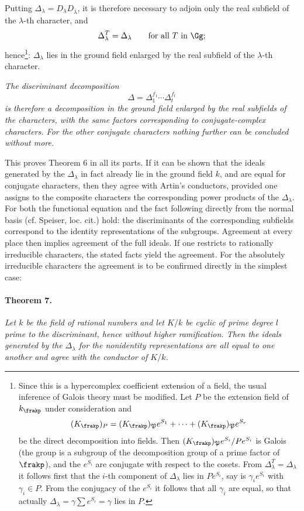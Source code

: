 Putting \(\Delta_\lambda=D_\lambda D_{\bar\lambda}\), it is therefore necessary to adjoin only the real subfield of the \(\lambda\)-th character, and
\[
        \Delta_\lambda^T=\Delta_\lambda
        \qquad\hbox{for all }T\hbox{ in }\Gg;
\]
hence\footnote{Since this is a hypercomplex coefficient extension of a field, the usual inference of Galois theory must be modified. Let \(P\) be the extension field of \(k_\frakp\) under consideration and
\[
        (K_\frakp)_P=(K_\frakp)_\mathfrak P e^{S_1}+\cdots+(K_\frakp)_\mathfrak P e^{S_r}
\]
be the direct decomposition into fields. Then \((K_\frakp)_\mathfrak P e^{S_i}/Pe^{S_i}\) is Galois (the group is a subgroup of the decomposition group of a prime factor of \(\frakp\)), and the \(e^{S_i}\) are conjugate with respect to the cosets. From \(\Delta_\lambda^T=\Delta_\lambda\) it follows first that the \(i\)-th component of \(\Delta_\lambda\) lies in \(Pe^{S_i}\), say is \(\gamma_i e^{S_i}\) with \(\gamma_i\in P\). From the conjugacy of the \(e^{S_i}\) it follows that all \(\gamma_i\) are equal, so that actually \(\Delta_\lambda=\gamma\sum e^{S_i}=\gamma\) lies in \(P\).}: \(\Delta_\lambda\) lies in the ground field enlarged by the real subfield of the \(\lambda\)-th character.

\emph{The discriminant decomposition}
\[
        \Delta=\Delta_1^{f_1}\cdots\Delta_t^{f_t}
\]
\emph{is therefore a decomposition in the ground field enlarged by the real subfields of the characters, with the same factors corresponding to conjugate-complex characters. For the other conjugate characters nothing further can be concluded without more.}

This proves Theorem 6 in all its parts. If it can be shown that the ideals generated by the \(\Delta_\lambda\) in fact already lie in the ground field \(k\), and are equal for conjugate characters, then they agree with Artin's conductors, provided one assigns to the composite characters the corresponding power products of the \(\Delta_\lambda\). For both the functional equation and the fact following directly from the normal basis (cf. Speiser, loc. cit.) hold: the discriminants of the corresponding subfields correspond to the identity representations of the subgroups. Agreement at every place then implies agreement of the full ideals. If one restricts to rationally irreducible characters, the stated facts yield the agreement. For the absolutely irreducible characters the agreement is to be confirmed directly in the simplest case:

\paragraph{Theorem 7.}
\emph{Let \(k\) be the field of rational numbers and let \(K/k\) be cyclic of prime degree \(l\) prime to the discriminant, hence without higher ramification. Then the ideals generated by the \(\Delta_\lambda\) for the nonidentity representations are all equal to one another and agree with the conductor of \(K/k\).}

